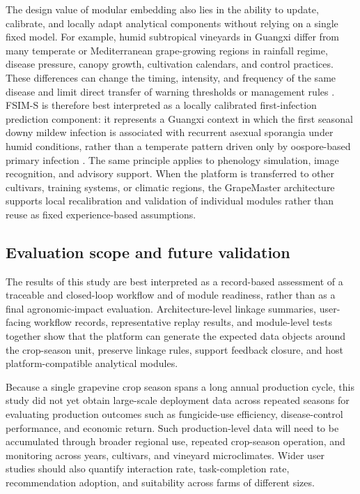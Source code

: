 \documentclass[12pt]{article}
\begin{document}
The design value of modular embedding also lies in the ability to update, calibrate, and locally adapt analytical components without relying on a single fixed model. For example, humid subtropical vineyards in Guangxi differ from many temperate or Mediterranean grape-growing regions in rainfall regime, disease pressure, canopy growth, cultivation calendars, and control practices. These differences can change the timing, intensity, and frequency of the same disease and limit direct transfer of warning thresholds or management rules \citep{seemForecastingPlantDisease2004,yuEffectsRainShelter2017,wangAssessingGrapevinePhenological2020}. FSIM-S is therefore best interpreted as a locally calibrated first-infection prediction component: it represents a Guangxi context in which the first seasonal downy mildew infection is associated with recurrent asexual sporangia under humid conditions, rather than a temperate pattern driven only by oospore-based primary infection \citep{rossiMechanisticModelSimulating2008,caffiModelPredictingPrimary2009c,caffiEvaluationDynamicModel2011,brischettoWeatherDrivenModelPredicting2021}. The same principle applies to phenology simulation, image recognition, and advisory support. When the platform is transferred to other cultivars, training systems, or climatic regions, the GrapeMaster architecture supports local recalibration and validation of individual modules rather than reuse as fixed experience-based assumptions.

\subsection{Evaluation scope and future validation}\label{scope-limitations-and-future-evaluation}

The results of this study are best interpreted as a record-based assessment of a traceable and closed-loop workflow and of module readiness, rather than as a final agronomic-impact evaluation. Architecture-level linkage summaries, user-facing workflow records, representative replay results, and module-level tests together show that the platform can generate the expected data objects around the crop-season unit, preserve linkage rules, support feedback closure, and host platform-compatible analytical modules.

Because a single grapevine crop season spans a long annual production cycle, this study did not yet obtain large-scale deployment data across repeated seasons for evaluating production outcomes such as fungicide-use efficiency, disease-control performance, and economic return. Such production-level data will need to be accumulated through broader regional use, repeated crop-season operation, and monitoring across years, cultivars, and vineyard microclimates. Wider user studies should also quantify interaction rate, task-completion rate, recommendation adoption, and suitability across farms of different sizes.
\end{document}
